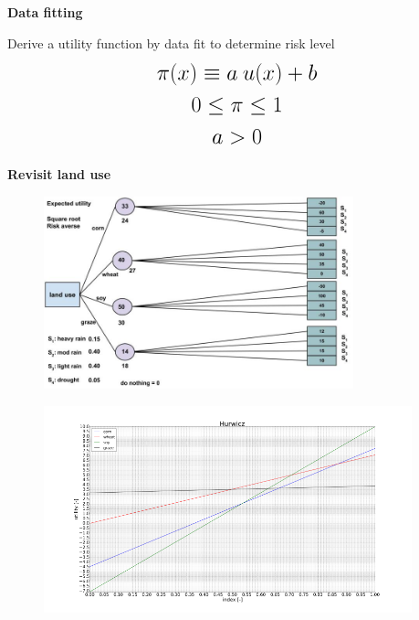\documentclass[aspectratio=1610,pdftex,dvipsnames,compress,xcolor={dvipsnames}]{beamer}
\begin{document}
\begin{frame}[plain]{}
    \centering\LARGE\textbf{Data fitting}
\end{frame}


\addtocounter{framenumber}{-1}
\begin{frame}{Derive a utility function by data fit to determine risk level}
    \begin{equation}
        \LARGE
        \begin{gathered}
            \pi(x) \equiv a \: u(x) + b\\
            0 \leq \pi \leq 1 \\
            a > 0
        \end{gathered}
    \end{equation}
\end{frame}


\begin{frame}[plain]{}
    \centering\LARGE\textbf{Revisit land use}
\end{frame}


\addtocounter{framenumber}{-1}
\begin{frame}{}
    \begin{figure}
        \centering
        \includegraphics[width=0.80\textwidth]{decision.tree_risk.averse.jpg}
    \end{figure}
\end{frame}


\begin{frame}{}
    \begin{figure}
        \centering
        \includegraphics[width=0.95\textwidth]{hurwicz_risk.averse.jpg}
    \end{figure}
\end{frame}
\end{document}
